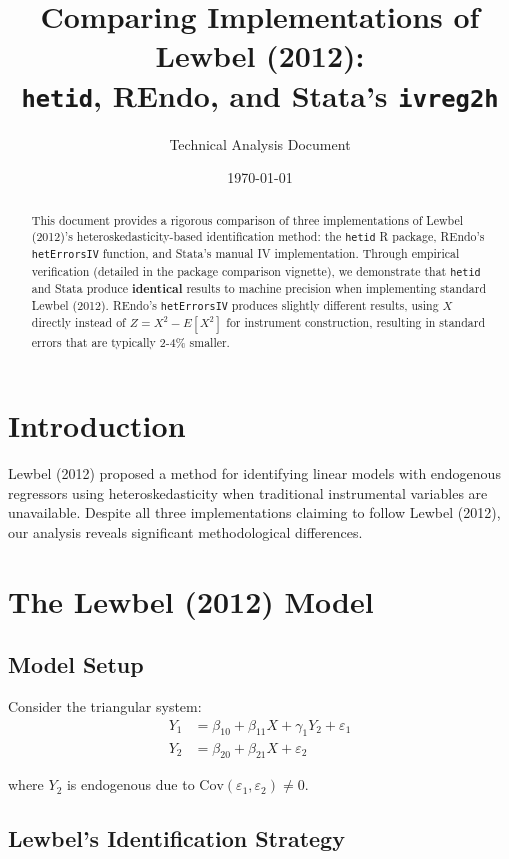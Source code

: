 \documentclass[12pt]{article}
\title{Comparing Implementations of Lewbel (2012):\\
\texttt{hetid}, REndo, and Stata's \texttt{ivreg2h}}
\author{Technical Analysis Document}
\date{\today}
\begin{document}
\maketitle

\begin{abstract}
This document provides a rigorous comparison of three implementations of Lewbel (2012)'s heteroskedasticity-based identification method: the \texttt{hetid} R package, REndo's \texttt{hetErrorsIV} function, and Stata's manual IV implementation. Through empirical verification (detailed in the package comparison vignette), we demonstrate that \texttt{hetid} and Stata produce \textbf{identical} results to machine precision when implementing standard Lewbel (2012). REndo's \texttt{hetErrorsIV} produces slightly different results, using $X$ directly instead of $Z = X^2 - E[X^2]$ for instrument construction, resulting in standard errors that are typically 2-4\% smaller.
\end{abstract}

\section{Introduction}

Lewbel (2012) proposed a method for identifying linear models with endogenous regressors using heteroskedasticity when traditional instrumental variables are unavailable. Despite all three implementations claiming to follow Lewbel (2012), our analysis reveals significant methodological differences.

\section{The Lewbel (2012) Model}

\subsection{Model Setup}

Consider the triangular system:
\begin{align}
Y_1 &= \beta_{10} + \beta_{11}X + \gamma_1 Y_2 + \varepsilon_1 \label{eq:structural}\\
Y_2 &= \beta_{20} + \beta_{21}X + \varepsilon_2 \label{eq:first-stage}
\end{align}

where $Y_2$ is endogenous due to $\text{Cov}(\varepsilon_1, \varepsilon_2) \neq 0$.

\subsection{Lewbel's Identification Strategy}
\end{document}
